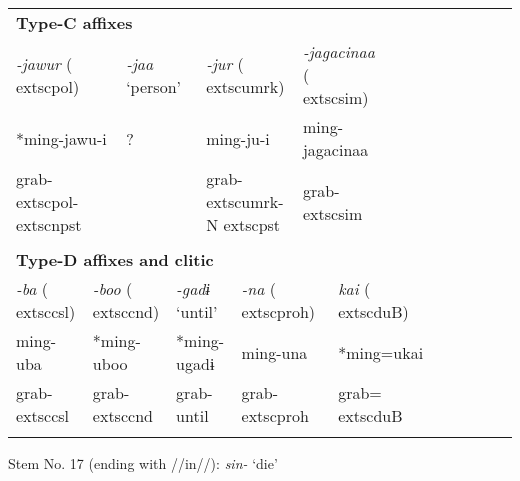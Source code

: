 \begin{tabularx}{\textwidth}{XXXXXXXXXXXXXXXXXXXXXXX}
\multicolumn{23}{X}{{\bfseries Type-C affixes}}\\
\multicolumn{4}{X}{{ \textit{{}-jawur} (	extsc{pol})}} & \multicolumn{3}{X}{{ \textit{{}-jaa} ‘person’}} & \multicolumn{4}{X}{{ \textit{{}-jur} (	extsc{umrk})}} & \multicolumn{4}{X}{{ \textit{{}-jagacinaa} (	extsc{sim})}} & \multicolumn{8}{X}{}\\
\multicolumn{4}{X}{{ *ming-jawu-i}} & \multicolumn{3}{X}{{ ?}} & \multicolumn{4}{X}{ming-ju-i} & \multicolumn{4}{X}{{ ming-jagacinaa}} & \multicolumn{8}{X}{}\\
\multicolumn{4}{X}{grab-	extsc{pol}-	extsc{npst}} & \multicolumn{3}{X}{} & \multicolumn{4}{X}{grab-	extsc{umrk}-N	extsc{pst}} & \multicolumn{4}{X}{grab-	extsc{sim}} & \multicolumn{8}{X}{}\\
\multicolumn{23}{X}{}\\
\multicolumn{23}{X}{{\bfseries Type-D affixes and clitic}}\\
\multicolumn{2}{X}{{ \textit{{}-ba} (	extsc{csl})}} & \multicolumn{4}{X}{{ \textit{{}-boo} (	extsc{cnd})}} & \multicolumn{3}{X}{{ \textit{{}-gadɨ} ‘until’}} & \multicolumn{3}{X}{{ \textit{{}-na} (	extsc{proh})}} & \multicolumn{6}{X}{{ \textit{kai} (	extsc{du}B)}} & \multicolumn{5}{X}{}\\
\multicolumn{2}{X}{{ ming-uba}} & \multicolumn{4}{X}{{ *ming-uboo}} & \multicolumn{3}{X}{{ *ming-ugadɨ}} & \multicolumn{3}{X}{{ ming-una}} & \multicolumn{6}{X}{{ *ming=ukai}} & \multicolumn{5}{X}{}\\
\multicolumn{2}{X}{grab-	extsc{csl}} & \multicolumn{4}{X}{grab-	extsc{cnd}} & \multicolumn{3}{X}{grab-until} & \multicolumn{3}{X}{grab-	extsc{proh}} & \multicolumn{6}{X}{grab=	extsc{du}B} & \multicolumn{5}{X}{}\\
\lspbottomrule
\end{tabularx}
Stem No. 17 (ending with //in//): \textit{sin-} ‘die’

\tablefirsthead{}


